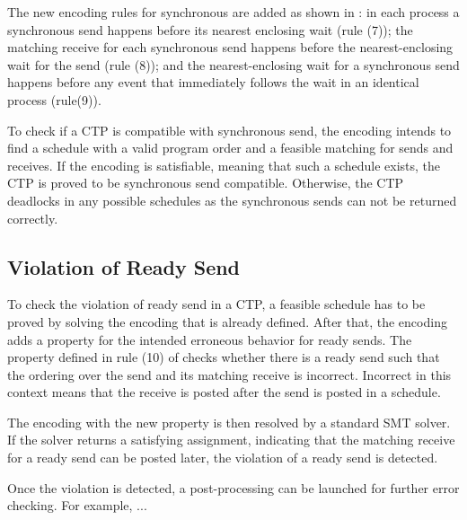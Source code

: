 The new encoding rules for synchronous are added as shown in : in each process a synchronous send happens before its nearest enclosing wait (rule (7)); the matching receive for each synchronous send happens before the nearest-enclosing wait for the send (rule (8)); and the nearest-enclosing wait for a synchronous send happens before any event that immediately follows the wait in an identical process (rule(9)).

\encodingsync

To check if a CTP is compatible with synchronous send, the encoding intends to find a schedule with a valid program order and a feasible matching for sends and receives. If the encoding is satisfiable, meaning that such a schedule exists, the CTP is proved to be synchronous send compatible. Otherwise, the CTP deadlocks in any possible schedules as the synchronous sends can not be returned correctly.




\subsection{Violation of Ready Send}

To check the violation of ready send in a CTP, a feasible schedule has to be proved by solving the encoding that is already defined. After that, the encoding adds a property for the intended erroneous behavior for ready sends. The property defined in rule (10) of  checks whether there is a ready send such that the ordering over the send and its matching receive is incorrect. Incorrect in this context means that the receive is posted after the send is posted in a schedule.

\encodingready

The encoding with the new property is then resolved by a standard SMT solver. If the solver returns a satisfying assignment, indicating that the matching receive for a ready send can be posted later, the violation of a ready send is detected.

Once the violation is detected, a post-processing can be launched for further error checking. For example, ... 






